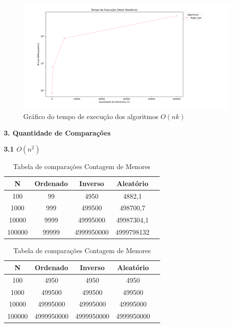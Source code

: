 \documentclass[10pt]{article}
\begin{document}
\begin{figure}[H]
  \centering
  \includegraphics[width=1.1\textwidth]{TempoExecnk.png}
  \caption{Gráfico do tempo de execução dos algoritmos $O(n k)$}
  \label{fig:3}
\end{figure}

\vspace{0.25cm}

\textbf{3. Quantidade de Comparações}

\vspace{0.5cm}

\textbf{3.1 $O(n^2)$}

\begin{table}[H]
  \parbox{.45\linewidth}{
    \centering
    \caption{Tabela de comparações BubbleSort}
    \begin{tabular}{|c|c|c|c|c|}
    \hline
    N & Ordenado & Inverso & Aleatório \\ \hline
    100 & 99 & 4950 & 4882,1 \\ \hline
    1000 & 999 & 499500 & 498700,7 \\ \hline
    10000 & 9999 & 49995000 & 49987304,1 \\ \hline
    100000 & 99999 & 4999950000 & 4999798132 \\ \hline
    \end{tabular}
  }
  \hfill
  \parbox{.45\linewidth}{
    \centering
    \caption{Tabela de comparações Contagem de Menores}
    \begin{tabular}{|c|c|c|c|c|}
    \hline
    N & Ordenado & Inverso & Aleatório \\ \hline
    100 & 4950 & 4950 & 4950 \\ \hline
    1000 & 499500 & 499500 & 499500 \\ \hline
    10000 & 49995000 & 49995000 & 49995000 \\ \hline
    100000 & 4999950000 & 4999950000 & 4999950000 \\ \hline
    \end{tabular}
  }
\end{table}
\end{document}
